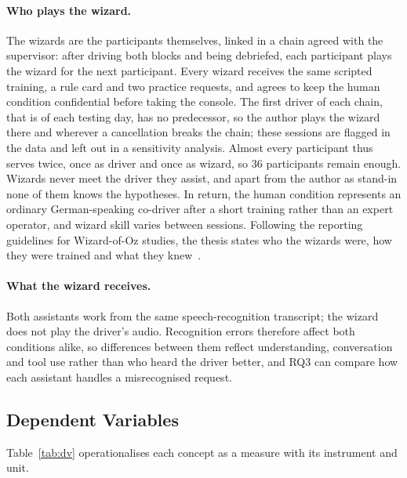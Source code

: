 \documentclass[
    a4paper,
    11pt,
    DIV=11,
    bigheadings,
    idxtotoc,
    listof=totoc,
    bibtotoc,
    halfparskip,
    cleardoubleempty,
    openright,
    oneside
]{scrartcl}
\begin{document}
\paragraph{Who plays the wizard.}
The wizards are the participants themselves, linked in a chain agreed with the supervisor: after driving both blocks and being debriefed, each participant plays the wizard for the next participant.
Every wizard receives the same scripted training, a rule card and two practice requests, and agrees to keep the human condition confidential before taking the console.
The first driver of each chain, that is of each testing day, has no predecessor, so the author plays the wizard there and wherever a cancellation breaks the chain; these sessions are flagged in the data and left out in a sensitivity analysis.
Almost every participant thus serves twice, once as driver and once as wizard, so 36 participants remain enough.
Wizards never meet the driver they assist, and apart from the author as stand-in none of them knows the hypotheses.
In return, the human condition represents an ordinary German-speaking co-driver after a short training rather than an expert operator, and wizard skill varies between sessions.
Following the reporting guidelines for Wizard-of-Oz studies, the thesis states who the wizards were, how they were trained and what they knew~\cite{Riek12Wizard}.

\paragraph{What the wizard receives.}
Both assistants work from the same speech-recognition transcript; the wizard does not play the driver's audio.
Recognition errors therefore affect both conditions alike, so differences between them reflect understanding, conversation and tool use rather than who heard the driver better, and RQ3 can compare how each assistant handles a misrecognised request.

\subsection{Dependent Variables}

Table~\ref{tab:dv} operationalises each concept as a measure with its instrument and unit.
\end{document}
